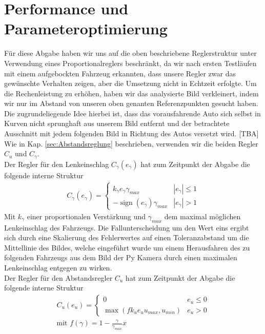 \documentclass[10pt]{article}
\DeclareMathOperator{\sign}{sign}
\begin{document}
\section{Performance und Parameteroptimierung}
Für diese Abgabe haben wir uns auf die oben beschriebene Reglerstruktur unter Verwendung eines Proportionalreglers beschränkt, da wir nach ersten Testläufen mit einem aufgebockten Fahrzeug erkannten, dass unsere Regler zwar das gewünschte Verhalten zeigen, aber die Umsetzung nicht in Echtzeit erfolgte. Um die Rechenleistung zu erhöhen, haben wir das analysierte Bild verkleinert, indem wir nur im Abstand von unseren oben genanten Referenzpunkten gesucht haben. Die zugrundeliegende Idee hierbei ist, dass das vorausfahrende Auto sich selbst in Kurven nicht sprunghaft aus unserem Bild entfernt und der betrachtete Ausschnitt mit jedem folgenden Bild in Richtung des Autos versetzt wird. [TBA]\\
Wie in Kap. \ref{sec:Abstandsreglung} beschrieben, verwenden wir die beiden Regler $C_u$ und $C_{\gamma}$.\\
Der Regler für den Lenkeinschlag $C_{\gamma}(e_{\gamma})$ hat zum Zeitpunkt der Abgabe die folgende interne Struktur
\begin{eqnarray}
C_{\gamma}(e_{\gamma}) = \begin{cases} k_{\gamma}e_{\gamma}\gamma_{max} & |e_{\gamma}| \leq 1 \\
                                        -\sign (e_{\gamma})\gamma_{max} &  |e_{\gamma}| > 1
\end{cases}
\end{eqnarray}
Mit $k_{\gamma}$ einer proportionalen Verstärkung und $\gamma_{max}$ dem maximal möglichen Lenkeinschlag des Fahrzeugs. Die Fallunterscheidung um den Wert eins ergibt sich durch eine Skalierung des Fehlerwertes auf einen Toleranzabstand um die Mittellinie des Bildes, welche eingeführt wurde um einem Herausfahren des zu folgenden Fahrzeugs aus dem Bild der Py Kamera durch einen maximalen Lenkeinschlag entgegen zu wirken.\\
Der Regler für den Abstandsregler $C_{u}$ hat zum Zeitpunkt der Abgabe die folgende interne Struktur
\begin{eqnarray}
C_{u}(e_{u}) = \begin{cases} 0 & e_{u} \leq 0 \\
\max (fk_{u}e_{u}u_{max},u_{min}) &  e_{u} > 0
\end{cases}\\
\text{mit } f(\gamma)=1-\frac{\gamma}{\gamma_{max}}x
\end{eqnarray}
\end{document}
